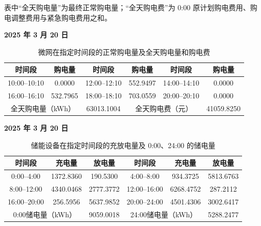 \documentclass[12pt,a4paper]{ctexart}
\renewcommand{\textbf}[1]{{\CJKfamily{heiti}\bfseries #1}}
\begin{document}
\par\noindent\hspace*{2em}表中“全天购电量”为最终正常购电量；“全天购电费”为 0:00 原计划购电费用、购电调整费用与紧急购电费用之和。

\begin{table}[H]
\centering
\caption{微网在指定时间段的正常购电量及全天购电量和购电费}
\label{tab:q3-purchase-selected}
\footnotesize
\renewcommand{\arraystretch}{1.15}

\textbf{2025 年 3 月 20 日}\par\vspace{0.2em}
\begin{tabular}{|c|c|c|c|c|c|}
\hline
时间段 & 购电量 & 时间段 & 购电量 & 时间段 & 购电量 \\
\hline
10:00--10:10 & 0.0000 & 12:00--12:10 & 552.9497 & 14:00--14:10 & 0.0000 \\
\hline
16:00--16:10 & 532.7965 & 18:00--18:10 & 703.0559 & 20:00--20:10 & 0.0000 \\
\hline
\multicolumn{2}{|c|}{全天购电量（kWh）} & 63013.1004 &
\multicolumn{2}{c|}{全天购电费（元）} & 41059.8250 \\
\hline
\end{tabular}
\end{table}

\begin{table}[H]
\centering
\caption{储能设备在指定时间段的充放电量及 0:00、24:00 的储电量}
\label{tab:q3-storage-selected}
\footnotesize
\renewcommand{\arraystretch}{1.15}

\textbf{2025 年 3 月 20 日}\par\vspace{0.2em}
\begin{tabular}{|c|c|c|c|c|c|}
\hline
时间段 & 充电量 & 放电量 & 时间段 & 充电量 & 放电量 \\
\hline
0:00--4:00 & 1372.8360 & 190.5300 & 4:00--8:00 & 934.3725 & 5813.6763 \\
\hline
8:00--12:00 & 4340.0468 & 2777.3772 & 12:00--16:00 & 6268.4752 & 287.2112 \\
\hline
16:00--20:00 & 256.5956 & 5637.9852 & 20:00--24:00 & 4501.4306 & 3002.6417 \\
\hline
\multicolumn{2}{|c|}{0:00储电量（kWh）} & 9059.0018 &
\multicolumn{2}{c|}{24:00储电量（kWh）} & 5288.2477 \\
\hline
\end{tabular}
\end{table}
\end{document}
